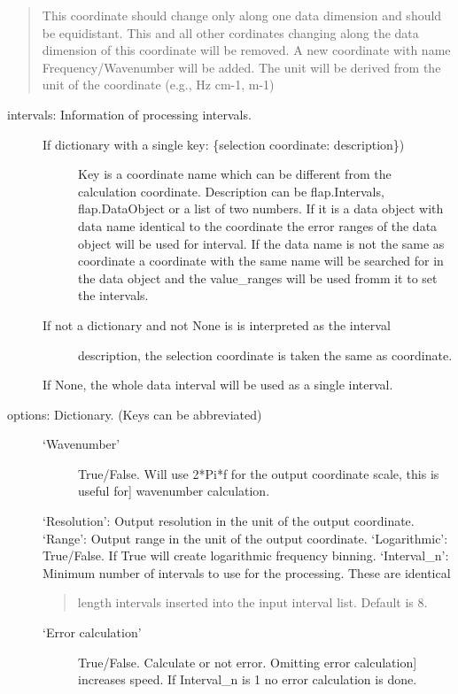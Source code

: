\documentclass[letterpaper,10pt,english]{sphinxmanual}
\begin{document}
\begin{fulllineitems}
\begin{fulllineitems}
\begin{description}
\begin{quote}
This coordinate should change only along one data dimension and should be equidistant.
This and all other cordinates changing along the data dimension of
this coordinate will be removed. A new coordinate with name
Frequency/Wavenumber will be added. The unit will be
derived from the unit of the coordinate (e.g., Hz cm-1, m-1)
\end{quote}
\begin{description}
\item[{intervals: Information of processing intervals.}] \leavevmode\begin{description}
\item[{If dictionary with a single key: \{selection coordinate: description\})}] \leavevmode
Key is a coordinate name which can be different from the calculation
coordinate.
Description can be flap.Intervals, flap.DataObject or
a list of two numbers. If it is a data object with data name identical to
the coordinate the error ranges of the data object will be used for
interval. If the data name is not the same as coordinate a coordinate with the
same name will be searched for in the data object and the value\_ranges
will be used fromm it to set the intervals.

\item[{If not a dictionary and not None is is interpreted as the interval}] \leavevmode
description, the selection coordinate is taken the same as
coordinate.

\end{description}

If None, the whole data interval will be used as a single interval.

\item[{options: Dictionary. (Keys can be abbreviated)}] \leavevmode\begin{description}
\item[{‘Wavenumber’}] \leavevmode{[}True/False. Will use 2*Pi*f for the output coordinate scale, this is useful for{]}
wavenumber calculation.

\end{description}

‘Resolution’: Output resolution in the unit of the output coordinate.
‘Range’: Output range in the unit of the output coordinate.
‘Logarithmic’: True/False. If True will create logarithmic frequency binning.
‘Interval\_n’: Minimum number of intervals to use for the processing. These are identical
\begin{quote}

length intervals inserted into the input interval list. Default is 8.
\end{quote}
\begin{description}
\item[{‘Error calculation’}] \leavevmode{[}True/False. Calculate or not error. Omitting error calculation{]}
increases speed. If Interval\_n is 1 no error calculation is done.


\end{description}
\end{description}
\end{description}
\end{fulllineitems}
\end{fulllineitems}
\end{document}

